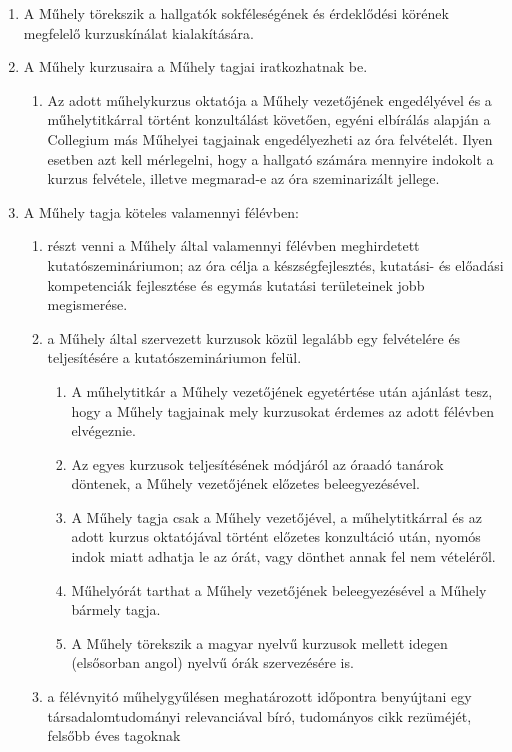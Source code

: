 \documentclass{rulebook}
\begin{document}
\begin{enumerate}
	\item A Műhely törekszik a hallgatók sokféleségének és érdeklődési körének megfelelő
	kurzuskínálat kialakítására.
	\item A Műhely kurzusaira a Műhely tagjai iratkozhatnak be.
	\begin{enumerate}
		\item Az adott műhelykurzus oktatója a Műhely vezetőjének engedélyével és a műhelytitkárral
		történt konzultálást követően, egyéni elbírálás alapján a Collegium
		más Műhelyei tagjainak engedélyezheti az óra felvételét. Ilyen esetben azt kell
		mérlegelni, hogy a hallgató számára mennyire indokolt a kurzus felvétele, illetve
		megmarad-e az óra szeminarizált jellege.
	\end{enumerate}
	\item  A Műhely tagja köteles valamennyi félévben:
	\begin{enumerate}
		\item részt venni a Műhely által valamennyi félévben meghirdetett kutatószemináriumon;
		az óra célja a készségfejlesztés, kutatási- és előadási kompetenciák fejlesztése
		és egymás kutatási területeinek jobb megismerése.
		\item a Műhely által szervezett kurzusok közül legalább egy felvételére és teljesítésére
		a kutatószemináriumon felül.
		\begin{enumerate}
			\item A műhelytitkár a Műhely vezetőjének egyetértése után ajánlást tesz,
			hogy a Műhely tagjainak mely kurzusokat érdemes az adott félévben elvégeznie.
			\item Az egyes kurzusok teljesítésének módjáról az óraadó tanárok döntenek,
			a Műhely vezetőjének előzetes beleegyezésével.
			\item A Műhely tagja csak a Műhely vezetőjével, a műhelytitkárral és az adott
			kurzus oktatójával történt előzetes konzultáció után, nyomós indok miatt
			adhatja le az órát, vagy dönthet annak fel nem vételéről.
			\item Műhelyórát tarthat a Műhely vezetőjének beleegyezésével a Műhely
			bármely tagja.
			\item A Műhely törekszik a magyar nyelvű kurzusok mellett idegen (elsősorban
			angol) nyelvű órák szervezésére is.
		\end{enumerate}
		\item a félévnyitó műhelygyűlésen meghatározott időpontra benyújtani egy társadalomtudományi
		relevanciával bíró, tudományos cikk rezüméjét, felsőbb éves tagoknak

\end{enumerate}
\end{enumerate}
\end{document}
